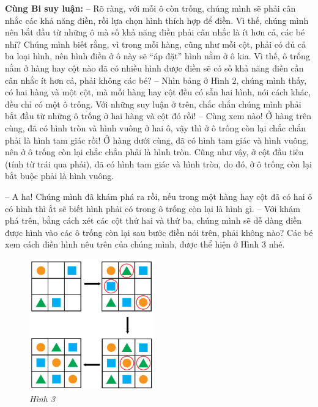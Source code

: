 	\textbf{Cùng Bi suy luận:}
	\vskip 0.15cm
	-- Rõ ràng, với mỗi ô còn trống, chúng mình sẽ phải cân nhắc các khả năng điền, rồi lựa chọn hình thích hợp để điền. Vì thế, chúng mình nên bắt đầu từ những ô mà số khả năng điền phải cân nhắc là ít hơn cả, các bé nhỉ? Chúng mình biết rằng, vì trong mỗi hàng, cũng như mỗi cột, phải có đủ cả ba loại hình, nên hình điền ở ô này sẽ “áp đặt” hình nằm ở ô kia. Vì thế, ô trống nằm ở hàng hay cột nào đã có nhiều hình được điền sẽ có số khả năng điền cần cân nhắc ít hơn cả, phải không các bé?
	\vskip 0.15cm
	-- Nhìn bảng ở Hình 2, chúng mình thấy, có hai hàng và một cột, mà mỗi hàng hay cột đều có sẵn hai hình, nói cách khác, đều chỉ có một ô trống. Với những suy luận ở trên, chắc chắn chúng mình phải bắt đầu từ những ô trống ở hai hàng và cột đó rồi!
	\vskip 0.15cm
	-- Cùng xem nào! Ở hàng trên cùng, đã có hình tròn và hình vuông ở hai ô, vậy thì ở ô trống còn lại chắc chắn phải là hình tam giác rồi! Ở hàng dưới cùng, đã có hình tam giác và hình vuông, nên ở ô trống còn lại chắc chắn phải là hình tròn. Cũng như vậy, ở cột đầu tiên (tính từ trái qua phải), đã có hình tam giác và hình tròn, do đó, ở ô trống còn lại bắt buộc phải là hình vuông.
	\vskip 0.15cm
	\begin{multicols}{2}
			-- A ha! Chúng mình đã khám phá ra rồi, nếu trong một hàng hay cột đã có hai ô có hình thì ắt sẽ biết hình phải có trong ô trống còn lại là hình gì.
		\vskip 0.15cm
		-- Với khám phá trên, bằng cách xét các cột thứ hai và thứ ba, chúng mình sẽ dễ dàng điền được hình vào các ô trống còn lại sau bước điền nói trên, phải không nào?
		\vskip 0.15cm
		Các bé xem cách điền hình nêu trên của chúng mình, được thể hiện ở Hình 3 nhé.
		\vskip 0.15cm
		\begin{figure}[H]
			\centering
			\vspace*{-10pt}
			\captionsetup{labelformat= empty, justification=centering}
			\includegraphics[width=0.48\textwidth]{hinh3}
			\caption{\small\textit{Hình 3}}
			\vspace*{-5pt}
		\end{figure}
	\end{multicols}
